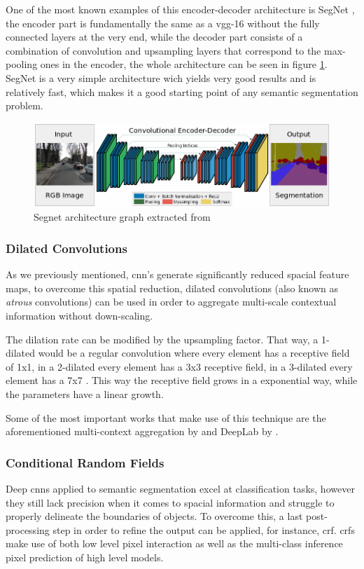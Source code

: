 One of the most known examples of this encoder-decoder architecture is SegNet \cite{DBLP:journals/corr/BadrinarayananK15}, the encoder part is fundamentally the same as a \gls{vgg}-16 without the fully connected layers at the very end, while the decoder part consists of a combination of convolution and upsampling layers that correspond to the max-pooling ones in the encoder, the whole architecture can be seen in figure \ref{fig:segnet}. SegNet is a very simple architecture wich yields very good results and is relatively fast, which makes it a good starting point of any semantic segmentation problem.

\begin{figure}[h]
	\includegraphics[scale=0.5]{archivos/segnet.png}
	\centering
	\caption{Segnet architecture graph extracted from \cite{DBLP:journals/corr/BadrinarayananK15}}
	\label{fig:segnet}
\end{figure}

\subsubsection{Dilated Convolutions}
As we previously mentioned, \gls{cnn}'s generate significantly reduced spacial feature maps, to overcome this spatial reduction, dilated convolutions (also known as \textit{atrous} convolutions) can be used in order to aggregate multi-scale contextual information without down-scaling.

The dilation rate can be modified by the upsampling factor. That way, a 1-dilated would be a regular convolution where every element has a receptive field of 1x1, in a 2-dilated every element has a 3x3 receptive field, in a 3-dilated every element has a 7x7 . This way the receptive field grows in a exponential way, while the parameters have a linear growth.

Some of the most important works that make use of this technique are the aforementioned multi-context aggregation by \cite{yu2015multiscale} and DeepLab by \cite{DBLP:journals/corr/ChenPK0Y16}.

\subsubsection{Conditional Random Fields}
Deep \gls{cnn}s applied to semantic segmentation excel at classification tasks, however they still lack precision when it comes to spacial information and struggle to properly delineate the boundaries of objects. To overcome this, a last post-processing step in order to refine the output can be applied, for instance, \gls{crf}. \gls{crf}s make use of both low level pixel interaction as well as the multi-class inference pixel prediction of high level models.


